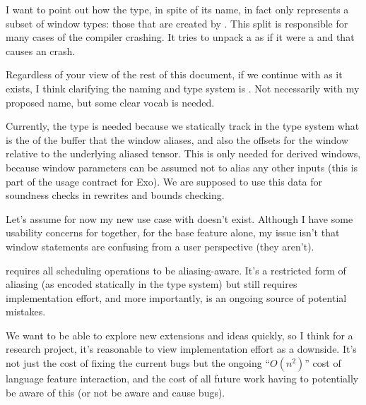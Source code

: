 I want to point out how the  type, in spite of its name, in fact only represents a subset of window types: those that are created by .
This split is responsible for many cases of the compiler crashing.
It tries to unpack a  as if it were a  and that causes an  crash.

\filbreak
Regardless of your view of the rest of this document, if we continue with  as it exists, I think clarifying the naming and type system is .
Not necessarily with my proposed name, but some clear vocab is needed.

\filbreak
Currently, the  type is needed because we statically track in the type system what is the  of the buffer that the window aliases, and also the offsets for the window relative to the underlying aliased tensor.
This is only needed for derived windows, because window parameters can be assumed not to alias any other inputs (this is part of the usage contract for Exo).
We are supposed to use this data for soundness checks in rewrites and bounds checking.

\filbreak
{}

Let's assume for now my new use case with  doesn't exist.
Although I have some usability concerns for  together, for the base  feature alone, my issue isn't that window statements are confusing from a user perspective (they aren't).

\filbreak
{}  requires all scheduling operations to be aliasing-aware.
It's a restricted form of aliasing (as encoded statically in the type system) but still requires implementation effort, and more importantly, is an ongoing source of potential mistakes.

\filbreak
We want to be able to explore new extensions and ideas quickly, so I think for a research project, it's reasonable to view implementation effort as a downside.
It's not just the cost of fixing the current  bugs but the ongoing ``$O(n^2)$'' cost of language feature interaction, and the cost of all future work having to potentially be aware of this (or not be aware and cause bugs).

